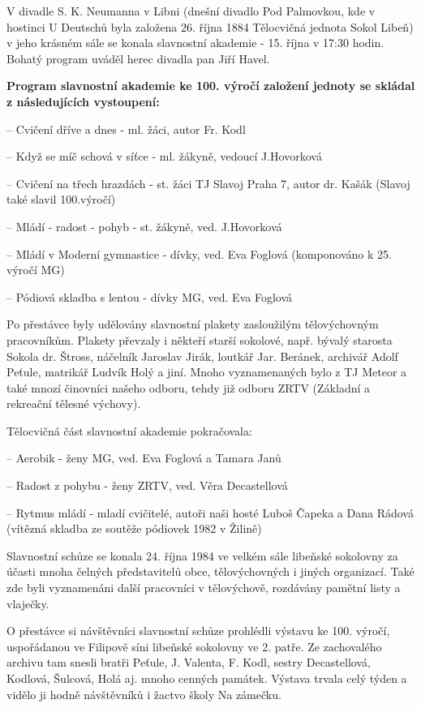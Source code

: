 V divadle S. K. Neumanna v Libni (dnešní divadlo Pod Palmovkou, kde v
hostinci U Deutschů byla založena 26. října 1884 Tělocvičná jednota
Sokol Libeň) v jeho krásném sále se konala slavnostní akademie - 15.
října v 17:30 hodin. Bohatý program uváděl herec divadla pan Jiří Havel.

\textbf{Program slavnostní akademie ke 100. výročí založení jednoty se
skládal z následujících vystoupení:}

-- Cvičení dříve a dnes - ml. žáci, autor Fr. Kodl

-- Když se míč schová v síťce - ml. žákyně, vedoucí J.Hovorková

-- Cvičení na třech hrazdách - st. žáci TJ Slavoj Praha 7, autor dr.
Kašák (Slavoj také slavil 100.výročí)

-- Mládí - radost - pohyb - st. žákyně, ved. J.Hovorková

-- Mládí v Moderní gymnastice - dívky, ved. Eva Foglová (komponováno k
25. výročí MG)

-- Pódiová skladba s lentou - dívky MG, ved. Eva Foglová

Po přestávce byly udělovány slavnostní plakety zasloužilým tělovýchovným
pracovníkům. Plakety převzaly i někteří starší sokolové, např. bývalý
starosta Sokola dr. Štross, náčelník Jaroslav Jirák, loutkář Jar.
Beránek, archivář Adolf Peťule, matrikář Ludvík Holý a jiní. Mnoho
vyznamenaných bylo z TJ Meteor a také mnozí činovníci našeho odboru,
tehdy již odboru ZRTV (Základní a rekreační tělesné výchovy).

Tělocvičná část slavnostní akademie pokračovala:

-- Aerobik - ženy MG, ved. Eva Foglová a Tamara Janů

-- Radost z pohybu - ženy ZRTV, ved. Věra Decastellová

-- Rytmus mládí - mladí cvičitelé, autoři naši hosté Luboš Čapeka a Dana
Rádová (vítězná skladba ze soutěže pódiovek 1982 v Žilině)

Slavnostní schůze se konala 24. října 1984 ve velkém sále libeňské
sokolovny za účasti mnoha čelných představitelů obce, tělovýchovných i
jiných organizací. Také zde byli vyznamenáni další pracovníci v
tělovýchově, rozdávány pamětní listy a vlaječky.

O přestávce si návštěvníci slavnostní schůze prohlédli výstavu ke 100.
výročí, uspořádanou ve Filipově síni libeňské sokolovny ve 2. patře. Ze
zachovalého archivu tam snesli bratři Peťule, J. Valenta, F. Kodl,
sestry Decastellová, Kodlová, Šulcová, Holá aj. mnoho cenných památek.
Výstava trvala celý týden a vidělo ji hodně návštěvníků i žactvo školy
Na zámečku.

